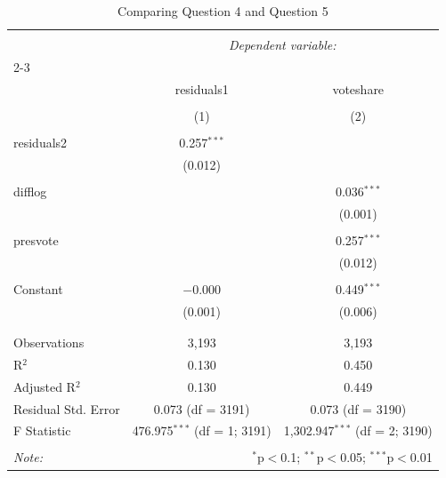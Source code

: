 
\begin{table}[!htbp] \centering 
  \caption{Comparing Question 4 and Question 5} 
  \label{tab:q5comp} 
\begin{tabular}{@{\extracolsep{5pt}}lcc} 
\\[-1.8ex]\hline 
\hline \\[-1.8ex] 
 & \multicolumn{2}{c}{\textit{Dependent variable:}} \\ 
\cline{2-3} 
\\[-1.8ex] & residuals1 & voteshare \\ 
\\[-1.8ex] & (1) & (2)\\ 
\hline \\[-1.8ex] 
 residuals2 & 0.257$^{***}$ &  \\ 
  & (0.012) &  \\ 
  & & \\ 
 difflog &  & 0.036$^{***}$ \\ 
  &  & (0.001) \\ 
  & & \\ 
 presvote &  & 0.257$^{***}$ \\ 
  &  & (0.012) \\ 
  & & \\ 
 Constant & $-$0.000 & 0.449$^{***}$ \\ 
  & (0.001) & (0.006) \\ 
  & & \\ 
\hline \\[-1.8ex] 
Observations & 3,193 & 3,193 \\ 
R$^{2}$ & 0.130 & 0.450 \\ 
Adjusted R$^{2}$ & 0.130 & 0.449 \\ 
Residual Std. Error & 0.073 (df = 3191) & 0.073 (df = 3190) \\ 
F Statistic & 476.975$^{***}$ (df = 1; 3191) & 1,302.947$^{***}$ (df = 2; 3190) \\ 
\hline 
\hline \\[-1.8ex] 
\textit{Note:}  & \multicolumn{2}{r}{$^{*}$p$<$0.1; $^{**}$p$<$0.05; $^{***}$p$<$0.01} \\ 
\end{tabular} 
\end{table}  
